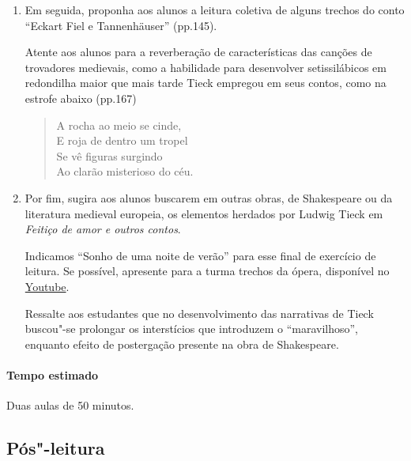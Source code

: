 \documentclass[12pt]{extarticle}
\begin{document}
\begin{enumerate}



\item 
Em seguida, proponha aos alunos a leitura coletiva de alguns trechos do conto 
``Eckart Fiel e Tannenhäuser'' (pp.145). 

Atente aos alunos para a reverberação de características das canções
de trovadores medievais, como a habilidade para desenvolver
setissilábicos em redondilha maior que mais tarde Tieck empregou em seus contos, como 
na estrofe abaixo (pp.167)

\begin{verse}
A rocha ao meio se cinde,\\
E roja de dentro um tropel\\
Se vê figuras surgindo\\
Ao clarão misterioso do céu.\\
\end{verse}

\item 
Por fim, sugira aos alunos buscarem em outras obras, de Shakespeare ou da literatura medieval 
europeia, os elementos herdados por Ludwig Tieck em \textit{Feitiço de amor e outros contos}. 


Indicamos ``Sonho de uma noite de verão'' para esse final de exercício de leitura.
Se possível, apresente para a turma trechos da ópera, disponível no  
\href{https://www.youtube.com/watch?v=1jdpM_spZe0\&ab_channel=TheatroS\%C3\%A3oPedro}{Youtube}.

Ressalte aos estudantes que no desenvolvimento das narrativas de Tieck buscou"-se 
prolongar os interstícios que introduzem o ``maravilhoso'', enquanto efeito de postergação 
presente na obra de Shakespeare. 


\end{enumerate}

\paragraph{Tempo estimado} Duas aulas de 50 minutos.


\subsection{Pós"-leitura}
\end{document}
